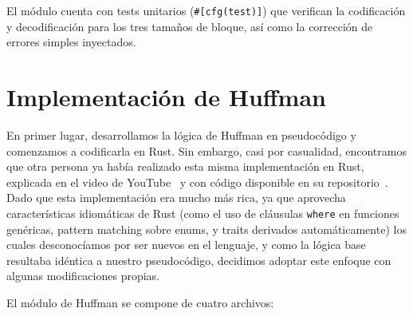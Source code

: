 El módulo cuenta con tests unitarios (\texttt{\#[cfg(test)]}) que verifican la codificación y decodificación para los tres tamaños de bloque, así como la corrección de errores simples inyectados.


\section*{Implementación de Huffman}


En primer lugar, desarrollamos la lógica de Huffman en pseudocódigo y comenzamos a codificarla en Rust. Sin embargo, casi por casualidad, encontramos que otra persona ya había realizado esta misma implementación en Rust, explicada en el video de YouTube~\citep{huffman_video} y con código disponible en su repositorio~\citep{huffman_repo}. Dado que esta implementación era mucho más rica, ya que aprovecha características idiomáticas de Rust (como el uso de cláusulas \texttt{where} en funciones genéricas, pattern matching sobre enums, y traits derivados automáticamente) los cuales desconocíamos por ser nuevos en el lenguaje, y como la lógica base resultaba idéntica a nuestro pseudocódigo, decidimos adoptar este enfoque con algunas modificaciones propias.

El módulo de Huffman se compone de cuatro archivos:

